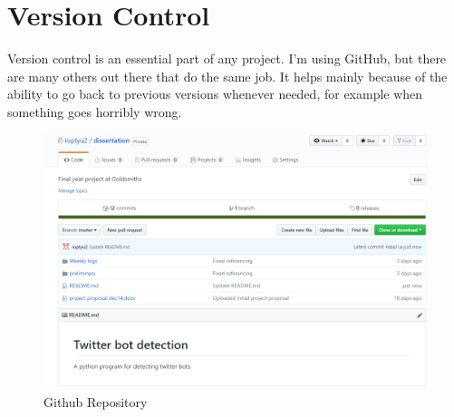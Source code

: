 \section{Version Control}
Version control is an essential part of any project. I'm using GitHub, but there are many others out there that do the same job. It helps mainly because of the ability to go back to previous versions whenever needed, for example when something goes horribly wrong. 
\begin{figure}[!h]
	\includegraphics[width=140mm]{figures/github}
	\caption{Github Repository}
\end{figure}
